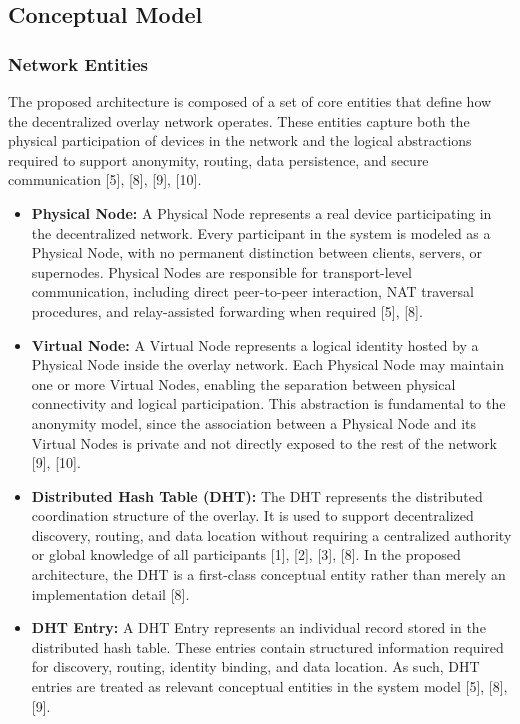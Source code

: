 \documentclass[12pt,a4paper]{article}
\begin{document}
\subsection{Conceptual Model}

\subsubsection{Network Entities}

The proposed architecture is composed of a set of core entities that define how the decentralized overlay network operates. These entities capture both the physical participation of devices in the network and the logical abstractions required to support anonymity, routing, data persistence, and secure communication [5], [8], [9], [10].

\begin{itemize}

\item \textbf{Physical Node:}  
A Physical Node represents a real device participating in the decentralized network. Every participant in the system is modeled as a Physical Node, with no permanent distinction between clients, servers, or supernodes. Physical Nodes are responsible for transport-level communication, including direct peer-to-peer interaction, NAT traversal procedures, and relay-assisted forwarding when required [5], [8].

\item \textbf{Virtual Node:}  
A Virtual Node represents a logical identity hosted by a Physical Node inside the overlay network. Each Physical Node may maintain one or more Virtual Nodes, enabling the separation between physical connectivity and logical participation. This abstraction is fundamental to the anonymity model, since the association between a Physical Node and its Virtual Nodes is private and not directly exposed to the rest of the network [9], [10].

\item \textbf{Distributed Hash Table (DHT):}  
The DHT represents the distributed coordination structure of the overlay. It is used to support decentralized discovery, routing, and data location without requiring a centralized authority or global knowledge of all participants [1], [2], [3], [8]. In the proposed architecture, the DHT is a first-class conceptual entity rather than merely an implementation detail [8].

\item \textbf{DHT Entry:}  
A DHT Entry represents an individual record stored in the distributed hash table. These entries contain structured information required for discovery, routing, identity binding, and data location. As such, DHT entries are treated as relevant conceptual entities in the system model [5], [8], [9].


\end{itemize}
\end{document}

